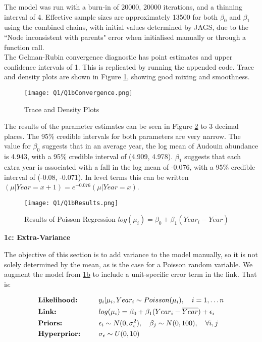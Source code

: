 \documentclass[11pt]{article}
\begin{document}
The model was run with a burn-in of 20000, 20000 iterations, and a thinning interval of 4. Effective sample sizes are approximately 13500 for both $\beta_0$ and $\beta_1$ using the combined chains, with initial values determined by JAGS, due to the ``Node inconsistent with parents" error when initialised manually or through a function call.\\
The Gelman-Rubin convergence diagnostic has point estimates and upper confidence intervals of 1. This is replicated by running the appended code. Trace and density plots are shown in Figure \ref{Fig::1bTrace}, showing good mixing and smoothness. 
\begin{figure}[!h]
\centering
\texttt{[image: Q1/Q1bConvergence.png]}
\caption{Trace and Density Plots} \label{Fig::1bTrace}
\end{figure}

The results of the parameter estimates can be seen in Figure \ref{Fig::1bRes} to 3 decimal places. The 95\% credible intervals for both parameters are very narrow. The value for $\beta_0$ suggests that in an average year, the log mean of Audouin abundance is 4.943, with a 95\% credible interval of (4.909, 4.978). $\beta_1$ suggests that each extra year is associated with a fall in the log mean of -0.076, with a 95\% credible interval of (-0.08, -0.071). In level terms this can be written $(\mu | Year = x+1) = e^{-0.076}(\mu | Year = x)$. 

\begin{figure}[!h]
\centering
\texttt{[image: Q1/Q1bResults.png]}
\caption{Results of Poisson Regression $log(\mu_i) = \beta_0 + \beta_1(Year_i - \overline{Year})$} \label{Fig::1bRes}
\end{figure}

\vspace{-4mm}

\textbf{1c: Extra-Variance} \label{sec::1c}

The objective of this section is to add variance to the model manually, so it is not solely determined by the mean, as is the case for a Poisson random variable. We augment the model from \hyperref[sec::1b]{1b} to include a unit-specific error term in the link. That is:

\vspace*{-3mm}

\begin{alignat*}{4}
&\text{\textbf{Likelihood:}} \qquad &&y_i | \mu_i, Year_i \sim Poisson(\mu_i), \quad i = 1, \dots n\\ 
&\text{\textbf{Link:}}        &&log(\mu_i)                 = \beta_0 + \beta_1(Year_i - \overline{Year}) +\epsilon_i\\
&\text{\textbf{Priors:}}        &&\epsilon_i \sim N(0, \sigma^2_\epsilon),  \quad \beta_j \sim N(0, 100), \quad \forall i, j \\
&\text{\textbf{Hyperprior:}} &&\sigma_\epsilon \sim U(0, 10)
\end{alignat*}\\
\vspace{-0mm}
\end{document}
